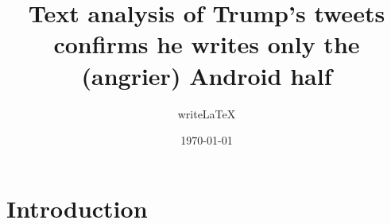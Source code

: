 \documentclass[a4paper,12pt]{article}
\title{Text analysis of Trump’s tweets confirms he writes only the
(angrier) Android half}
\author{writeLaTeX}
\date{\today}
\begin{document}
\maketitle

\section{Introduction}


\printbibliography
\end{document}
